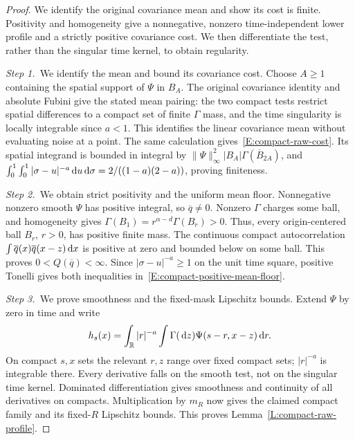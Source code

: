 \begin{proof}
  We identify the original covariance mean and show its cost is finite.
  Positivity and homogeneity give a nonnegative, nonzero time-independent lower
  profile and a strictly positive covariance cost. We then differentiate the
  test, rather than the singular time kernel, to obtain regularity.

  \medskip
  \noindent\textit{Step 1.~}We identify the mean and bound its covariance
  cost.
  Choose $A \ge 1$ containing the spatial support of $\Psi$ in $B_A$. The
  original covariance identity and absolute Fubini give the stated mean pairing:
  the two compact tests restrict spatial differences to a compact set of finite
  $\Gamma$ mass, and the time singularity is locally integrable since $a < 1$.
  This identifies the linear covariance mean without evaluating noise at a
  point. The same calculation gives~\eqref{E:compact-raw-cost}. Its spatial
  integrand is bounded in integral by
  $\|\Psi\|_\infty^2|B_A|\Gamma(\overline{B}_{2A})$, and
  $\int_0^1\int_0^1|\sigma-u|^{-a}\,\mathrm{d} u\,\mathrm{d}\sigma = 2/((1-a)(2-a))$, proving
  finiteness.

  \medskip
  \noindent\textit{Step 2.~}We obtain strict positivity and the uniform mean
  floor.
  Nonnegative nonzero smooth $\Psi$ has positive integral, so $\overline{q} \ne
  0$. Nonzero $\Gamma$ charges some ball, and homogeneity gives $\Gamma(B_1) =
  r^{\alpha-d}\Gamma(B_r) > 0$. Thus, every origin-centered ball $B_r$, $r > 0$,
  has positive finite mass. The continuous compact autocorrelation
  $\int\overline{q}(x)\overline{q}(x-z)\,\mathrm{d} x$ is positive at zero and bounded
  below on some ball. This proves $0 < Q(\overline{q}) < \infty$. Since
  $|\sigma-u|^{-a} \ge 1$ on the unit time square, positive Tonelli gives both
  inequalities in~\eqref{E:compact-positive-mean-floor}.


  \medskip
  \noindent\textit{Step 3.~}We prove smoothness and the fixed-mask Lipschitz
  bounds.
  Extend $\Psi$ by zero in time and write
  \[
    h_s(x)=\int_{\mathbb{R}} |r|^{-a}
    \int\Gamma(\,\mathrm{d} z)\Psi(s-r,x-z)\,\mathrm{d} r.
  \]
  On compact $s,x$ sets the relevant $r,z$ range over fixed compact sets;
  $|r|^{-a}$ is integrable there. Every derivative falls on the smooth test, not
  on the singular time kernel. Dominated differentiation gives smoothness and
  continuity of all derivatives on compacts. Multiplication by $m_R$ now gives
  the claimed compact family and its fixed-$R$ Lipschitz bounds. This proves
  Lemma~\ref{L:compact-raw-profile}.
\end{proof}

